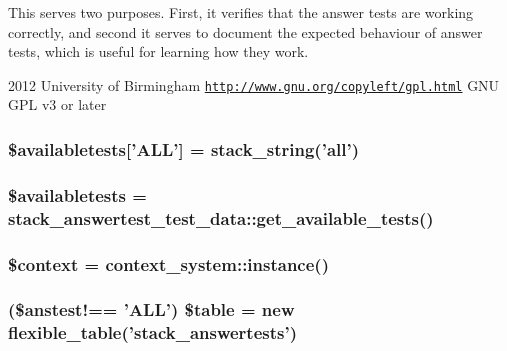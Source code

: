 This serves two purposes. First, it verifies that the answer tests are working correctly, and second it serves to document the expected behaviour of answer tests, which is useful for learning how they work.

2012 University of Birmingham  \href{http://www.gnu.org/copyleft/gpl.html}{\tt http://www.gnu.org/copyleft/gpl.html} GNU GPL v3 or later \hypertarget{answertests_8php_a3361b3cc65395e010e9d35b1bbfde7d2}{
\subsubsection[{\$availabletests}]{\setlength{\rightskip}{0pt plus 5cm}\$availabletests\mbox{[}'ALL'\mbox{]} = stack\_\-string('all')}}
\label{answertests_8php_a3361b3cc65395e010e9d35b1bbfde7d2}
\hypertarget{answertests_8php_aa40691406a81b9e8192fc2db224c48d2}{
\subsubsection[{\$availabletests}]{\setlength{\rightskip}{0pt plus 5cm}\$availabletests = stack\_\-answertest\_\-test\_\-data::get\_\-available\_\-tests()}}
\label{answertests_8php_aa40691406a81b9e8192fc2db224c48d2}
\hypertarget{answertests_8php_ae05dedb802ada0155efdece2044fed64}{
\subsubsection[{\$context}]{\setlength{\rightskip}{0pt plus 5cm}\$context = context\_\-system::instance()}}
\label{answertests_8php_ae05dedb802ada0155efdece2044fed64}
\hypertarget{answertests_8php_a7c64d22213f45a8e0013b6ff46009c84}{
\subsubsection[{\$table}]{ (\$anstest!== 'ALL') \$table = new flexible\_\-table('stack\_\-answertests')}}
\label{answertests_8php_a7c64d22213f45a8e0013b6ff46009c84}
